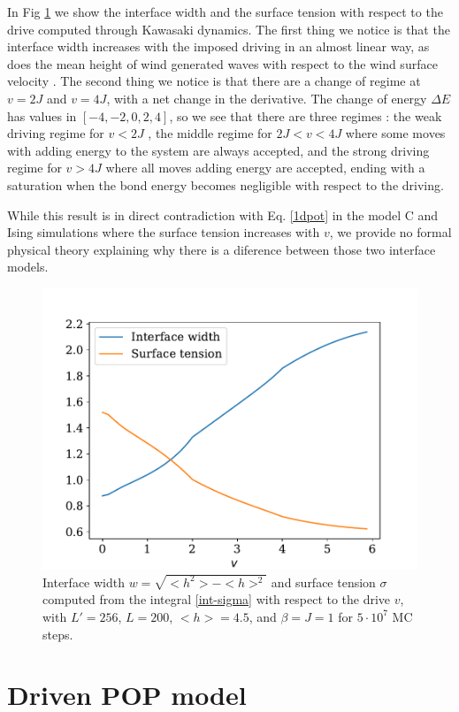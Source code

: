 In Fig \ref{fig-correl-drive} we show the interface width and the surface tension with respect to the drive computed through Kawasaki dynamics. The first thing we notice is that the interface width increases with the imposed driving in an almost linear way, as does the mean height of wind generated waves with respect to the wind surface velocity \cite{maat_roughness_1991}.
The second thing we notice is that there are a change of regime at $v=2J$ and $v=4J$, with a net change in the derivative. The change of energy $\Delta E$ has values in $[-4,-2,0,2,4]$, so we see that there are three regimes : the weak driving regime for $v \less 2J$ , the middle regime for $2J \less v \less 4J$ where some moves with adding energy to the system are always accepted, and the strong driving regime for $v \greater 4J$ where all moves adding energy are accepted, ending with a saturation when the bond energy becomes negligible with respect to the driving. 
 
While this result is in direct contradiction with Eq. \eqref{1dpot} in the model C and Ising simulations \cite{smith_interfaces_2008-1,smith_lateral_2010} where the surface tension increases with $v$, we provide no formal physical theory explaining why there is a diference between those two interface models. 

\begin{figure}
    \centering
    \includegraphics[width=0.7\linewidth]{drivenC/tension-drive.pdf}
    \caption{Interface width $w=\sqrt{<h^2>-<h>^2}$ and surface tension $\sigma$ computed from the integral \eqref{int-sigma} with respect to the drive $v$,  with $L'=256$, $L=200$, $<h> = 4.5$, and $\beta = J = 1$ for $5 \cdot 10^7$ MC steps.}
    \label{fig-correl-drive}    
\end{figure}

    \section{Driven POP model}

